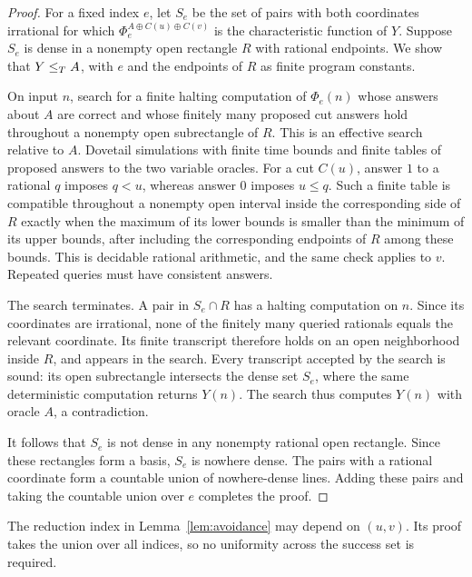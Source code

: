 \begin{proof}
For a fixed index $e$, let $S_e$ be the set of pairs with both
coordinates irrational for which
$\Phi_e^{A\oplus C(u)\oplus C(v)}$ is the characteristic
function of $Y$. Suppose $S_e$ is dense in a nonempty open
rectangle $R$ with rational endpoints. We show that $Y\le_T A$,
with $e$ and the endpoints of $R$ as finite program constants.

On input $n$, search for a finite halting computation of
$\Phi_e(n)$ whose answers about $A$ are correct and whose
finitely many proposed cut answers hold throughout a nonempty
open subrectangle of $R$. This is an effective search relative
to $A$. Dovetail simulations with finite time bounds and finite
tables of proposed answers to the two variable oracles.
For a cut $C(u)$, answer $1$ to a rational $q$ imposes $q<u$,
whereas answer $0$ imposes $u\le q$. Such a finite table is
compatible throughout a nonempty open interval inside the
corresponding side of $R$ exactly when the maximum of its lower
bounds is smaller than the minimum of its upper bounds,
after including the corresponding endpoints of $R$ among these bounds.
This is decidable rational arithmetic, and the same check
applies to $v$. Repeated queries must have consistent answers.

The search terminates. A pair in $S_e\cap R$ has a halting
computation on $n$. Since its coordinates are irrational, none
of the finitely many queried rationals equals the relevant
coordinate. Its finite transcript therefore holds on an open
neighborhood inside $R$, and appears in the search.
Every transcript accepted by the search is sound: its open
subrectangle intersects the dense set $S_e$, where the same
deterministic computation returns $Y(n)$. The search thus
computes $Y(n)$ with oracle $A$, a contradiction.

It follows that $S_e$ is not dense in any nonempty rational open
rectangle. Since these rectangles form a basis, $S_e$ is nowhere
dense. The pairs with a rational coordinate form a countable
union of nowhere-dense lines. Adding these pairs and taking
the countable union over $e$ completes the proof.
\end{proof}

The reduction index in Lemma~\ref{lem:avoidance} may depend on
$(u,v)$. Its proof takes the union over all indices, so no
uniformity across the success set is required.
